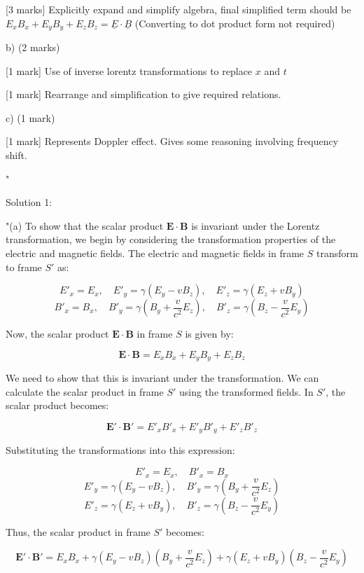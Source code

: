 [3 marks] Explicitly expand and simplify algebra, final simplified term should be \( E_x B_x + E_y B_y + E_z B_z = \underline{E} \cdot \underline{B} \) (Converting to dot product form not required)

b) (2 marks)

[1 mark] Use of inverse lorentz transformations to replace \( x \) and \( t \)

[1 mark] Rearrange and simplification to give required relations.

c) (1 mark)

[1 mark] Represents Doppler effect. Gives some reasoning involving frequency shift.

"

Solution 1: 

"(a) To show that the scalar product \( \mathbf{E} \cdot \mathbf{B} \) is invariant under the Lorentz transformation, we begin by considering the transformation properties of the electric and magnetic fields. The electric and magnetic fields in frame \( S \) transform to frame \( S' \) as:

\[
E'_x = E_x, \quad E'_y = \gamma (E_y - v B_z), \quad E'_z = \gamma (E_z + v B_y)
\]
\[
B'_x = B_x, \quad B'_y = \gamma \left( B_y + \frac{v}{c^2} E_z \right), \quad B'_z = \gamma \left( B_z - \frac{v}{c^2} E_y \right)
\]

Now, the scalar product \( \mathbf{E} \cdot \mathbf{B} \) in frame \( S \) is given by:

\[
\mathbf{E} \cdot \mathbf{B} = E_x B_x + E_y B_y + E_z B_z
\]

We need to show that this is invariant under the transformation. We can calculate the scalar product in frame \( S' \) using the transformed fields. In \( S' \), the scalar product becomes:

\[
\mathbf{E'} \cdot \mathbf{B'} = E'_x B'_x + E'_y B'_y + E'_z B'_z
\]

Substituting the transformations into this expression:

\[
E'_x = E_x, \quad B'_x = B_x
\]
\[
E'_y = \gamma (E_y - v B_z), \quad B'_y = \gamma \left( B_y + \frac{v}{c^2} E_z \right)
\]
\[
E'_z = \gamma (E_z + v B_y), \quad B'_z = \gamma \left( B_z - \frac{v}{c^2} E_y \right)
\]

Thus, the scalar product in frame \( S' \) becomes:

\[
\mathbf{E'} \cdot \mathbf{B'} = E_x B_x + \gamma (E_y - v B_z) \left( B_y + \frac{v}{c^2} E_z \right) + \gamma (E_z + v B_y) \left( B_z - \frac{v}{c^2} E_y \right)
\]

